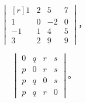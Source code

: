 \lianxi
\begin{xiaotis}

$$\begin{vmatrix*}[r]
    1  & 2 & 5  & 7 \\
    1  & 0 & -2 & 0 \\
    -1 & 1 & 4  & 5 \\
    3  & 2 & 9  & 9
\end{vmatrix*} \text{，}$$

\begin{xiaoxiaotis}




\end{xiaoxiaotis}


$$\begin{vmatrix*}
    0 & q & r & s \\
    p & 0 & r & s \\
    p & q & 0 & s \\
    p & q & r & 0
\end{vmatrix*} \text{。}$$

\end{xiaotis}









